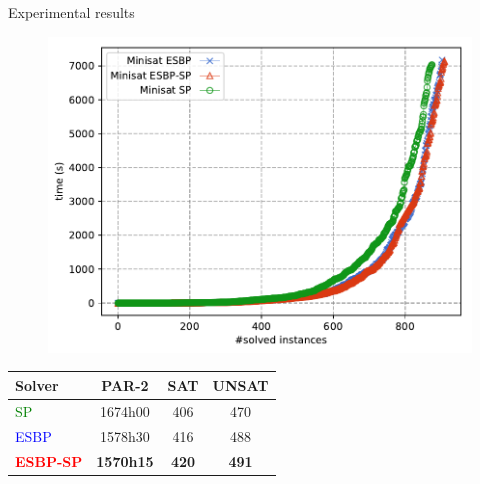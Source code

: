 \documentclass{beamer}
\begin{document}
\begin{frame}{Experimental results}

\begin{figure}[t]
	\centering
	{\includegraphics[scale=0.45]{images/combores}}

\end{figure}
\centering

\begin{tabular}{lccc}
	Solver & PAR-2  & SAT & UNSAT\\
	\toprule
	\textcolor{green}{SP} & 1674h00  & 406 & 470 \\
	\textcolor{blue}{ESBP} & 1578h30  & 416 & 488\\
	\textcolor{red}{\textbf{ESBP-SP}} & \cellcolor{gray!30}\textbf{1570h15} &  \cellcolor{gray!30}\textbf{420} & \cellcolor{gray!30}\textbf{491}\\
\end{tabular}
\end{frame}
\end{document}
